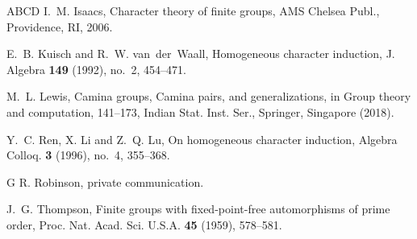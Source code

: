 \documentclass[twoside,a4paper,reqno,11pt]{amsart}
\newcommand{\<}{\langle}
\renewcommand{\>}{\rangle}
\renewcommand{\:}{\colon}
\theoremstyle{definition}
\begin{document}
\begin{thebibliography}{ABCD}
 I.~M. Isaacs, {Character theory of finite groups}, AMS Chelsea Publ., Providence, RI, 2006.

 E.~B. Kuisch and R.~W. van~der~Waall, Homogeneous character induction, J. Algebra {\bf 149} (1992), no.~2, 454--471.

 M.~L. Lewis, Camina groups, Camina pairs, and generalizations, in {Group theory and computation}, 141--173, Indian Stat. Inst. Ser., Springer, Singapore (2018).

Y.~C. Ren, X. Li and Z.~Q. Lu, On homogeneous character induction, Algebra Colloq. {\bf 3} (1996), no.~4, 355--368.

 G R. Robinson, private communication.

 J.~G. Thompson, Finite groups with fixed-point-free automorphisms of prime order, Proc. Nat. Acad. Sci. U.S.A. {\bf 45} (1959), 578--581. 

\end{thebibliography}
\end{document}
